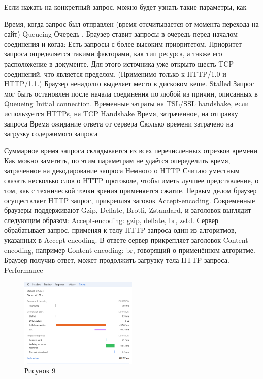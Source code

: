 \documentclass[12pt]{article}
\begin{document}
    Если нажать на конкретный запрос, можно будет узнать такие параметры, как

    Время, когда запрос был отправлен (время отсчитывается от момента перехода на сайт)
    Queueing Очередь . Браузер ставит запросы в очередь перед началом соединения и когда:
    Есть запросы с более высоким приоритетом. Приоритет запроса определяется такими факторами, как тип ресурса, а также его расположение в документе.
    Для этого источника уже открыто шесть TCP-соединений, что является пределом. (Применимо только к HTTP/1.0 и HTTP/1.1.)
    Браузер ненадолго выделяет место в дисковом кеше.
    Stalled Запрос мог быть остановлен после начала соединения по любой из причин, описанных в Queueing
    Initial connection. Временные затраты на TSL/SSL handshake, если используется HTTPs, на TCP Handshake
    Время, затраченное, на отправку запроса
    Время ожидание ответа от сервера
    Сколько времени затрачено на загрузку содержимого запроса

    Суммарное время запроса складывается из всех перечисленных отрезков времени
    Как можно заметить, по этим параметрам не удаётся опеределить время, затраченное на декодирование запроса
    Немного о HTTP
    Считаю уместным сказать несколько слов о HTTP протоколе, чтобы иметь лучшее представление, о том, как с технической точки зрения применяется сжатие.
    Первым делом браузер осуществляет HTTP запрос, прикрепляя заговок Accept-encoding. Современные браузеры поддерживают Gzip, Deflate, Brotli, Zstandard, и заголовок выглядит следующим
    образом: Accept-encoding: gzip, deflate, br, zstd. Сервер обрабатывает запрос, применяя к телу HTTP запроса один из алгоритмов, указанных в Accept-encoding. В ответе сервер прикрепляет заголовок Content-encoding, например Сontent-encoding: br, говорящий о применённом алгоритме. Браузер получив ответ, может продолжить загрузку тела HTTP запроса.
    Performance
    \begin{figure}[h!]
        \centering
        \includegraphics[width=0.5\textwidth]{../images/network__timing.png}
        \caption{Рисунок 9}
    \end{figure}
\end{document}
